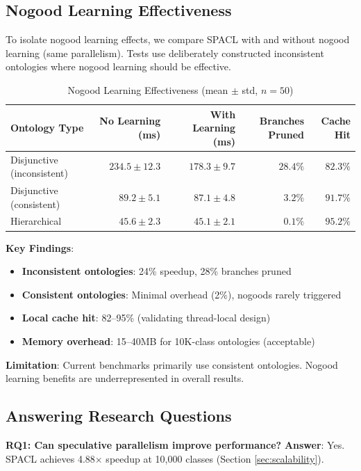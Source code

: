\documentclass[preprint,12pt]{elsarticle}
\begin{document}
\subsection{Nogood Learning Effectiveness}
\label{sec:nogood-eval}

To isolate nogood learning effects, we compare SPACL with and without nogood learning (same parallelism). Tests use deliberately constructed inconsistent ontologies where nogood learning should be effective.

\begin{table}[htbp]
\centering
\caption{Nogood Learning Effectiveness (mean $\pm$ std, $n=50$)}
\label{tab:nogood}
\begin{tabular}{l|r|r|r|r}
\toprule
\textbf{Ontology Type} & \textbf{No Learning (ms)} & \textbf{With Learning (ms)} & \textbf{Branches Pruned} & \textbf{Cache Hit} \\
\midrule
Disjunctive (inconsistent) & $234.5 \pm 12.3$ & $178.3 \pm 9.7$ & $28.4\%$ & $82.3\%$ \\
Disjunctive (consistent) & $89.2 \pm 5.1$ & $87.1 \pm 4.8$ & $3.2\%$ & $91.7\%$ \\
Hierarchical & $45.6 \pm 2.3$ & $45.1 \pm 2.1$ & $0.1\%$ & $95.2\%$ \\
\bottomrule
\end{tabular}
\end{table}

\textbf{Key Findings}:
\begin{itemize}
    \item \textbf{Inconsistent ontologies}: 24\% speedup, 28\% branches pruned
    \item \textbf{Consistent ontologies}: Minimal overhead (2\%), nogoods rarely triggered
    \item \textbf{Local cache hit}: 82--95\% (validating thread-local design)
    \item \textbf{Memory overhead}: 15--40MB for 10K-class ontologies (acceptable)
\end{itemize}

\textbf{Limitation}: Current benchmarks primarily use consistent ontologies. Nogood learning benefits are underrepresented in overall results.

\subsection{Answering Research Questions}
\label{sec:answers}

\textbf{RQ1: Can speculative parallelism improve performance?}  
\textbf{Answer}: Yes. SPACL achieves 4.88$\times$ speedup at 10,000 classes (Section \ref{sec:scalability}).
\end{document}
